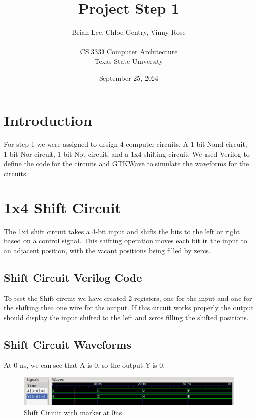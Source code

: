 \documentclass[12pt]{article}
\title{Project Step 1}
\author{Brian Lee, Chloe Gentry, Vinny Rose\\
\AND\\
\AND
\AND
\AND
\AND
	CS.3339 Computer Architecture\\
\AND
	Texas State University\\
}
\date{September 25, 2024}
\begin{document}
\maketitle

\newpage
\tableofcontents
\thispagestyle{empty}


\newpage
\setcounter{page}{1}
\section{Introduction}
For step 1 we were assigned to design 4 computer circuits. A 1-bit Nand circuit, 1-bit Nor circuit, 1-bit Not circuit, and a 1x4 shifting circuit. We used Verilog to define the code for the circuits and GTKWave to simulate the waveforms for the circuits.

\section{1x4 Shift Circuit}
\label{sec:headings}

The 1x4 shift circuit takes a 4-bit input and shifts the bits to the left or right based on a control signal. This shifting operation moves each bit in the input to an adjacent position, with the vacant positions being filled by zeros. 

\subsection{Shift Circuit Verilog Code}


To test the Shift circuit we have created 2 registers, one for the input and one for the shifting then one wire for the output. If this circuit works properly the output should display the input shifted to the left and zeros filling the shifted positions.



\subsection{Shift Circuit Waveforms}

At 0 ns, we can see that A is 0, so the output Y is 0.
\begin{figure}[H]
    \centering
    \includegraphics[width = 1.0\textwidth]{1x4bit-shift/shift_wave1.PNG}
    \caption{Shift Circuit with marker at 0ns}
    \label{fig:shift-wave1}
\end{figure}
\end{document}
